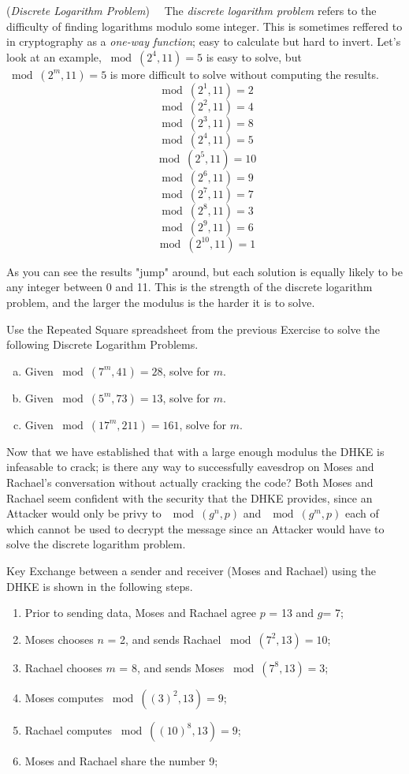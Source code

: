\begin{defn} \label{def:DLP}(\emph{Discrete Logarithm Problem})~~
The \emph{discrete logarithm problem} refers to the difficulty of finding logarithms modulo some integer. This is sometimes reffered to in cryptography as a \emph{one-way function}; easy to calculate but hard to invert. Let's look at an example, $\bmod(2^{4},  11) = 5$ is easy to solve, but $\bmod(2^{m},  11) = 5$ is more difficult to solve without computing the results. 
$$ \bmod(2^{1}, 11)=2$$
$$ \bmod(2^{2}, 11)=4$$
$$ \bmod(2^{3}, 11)=8$$
$$ \bmod(2^{4}, 11)=5$$
$$ \bmod(2^{5}, 11)=10$$
$$ \bmod(2^{6}, 11)=9$$
$$ \bmod(2^{7}, 11)=7$$
$$ \bmod(2^{8}, 11)=3$$
$$ \bmod(2^{9}, 11)=6$$
$$ \bmod(2^{10}, 11)=1$$

As you can see the results "jump" around, but each solution is equally likely to be any integer between 0 and 11.  This is the strength of the discrete logarithm problem, and the larger the modulus is the harder it is to solve.
\end{defn}
\begin{exer}
Use the Repeated Square spreadsheet from the previous Exercise to solve the following Discrete Logarithm Problems.  
\begin{enumerate}[(a)]
\item Given $ \bmod(7^{m}, 41)=28$, solve for $m$.

\item Given $ \bmod(5^{m}, 73)=13$, solve for $m$.

\item Given $ \bmod(17^{m}, 211)=161$, solve for $m$.
\end{enumerate}
\end{exer}
Now that we have established that with a large enough modulus the DHKE is infeasable to crack; is there any way to successfully eavesdrop on Moses and Rachael's conversation without actually cracking the code?  Both Moses and Rachael seem confident with the security that the DHKE provides, since an Attacker would only be privy to $\mod (g^n , p)$ and $\mod (g^m , p)$ each of which cannot be used to decrypt the message since an Attacker would have to solve the discrete logarithm problem.

\begin{eg} Key Exchange between a sender and receiver (Moses and Rachael) using the DHKE is shown in the following steps.
\begin{enumerate}[Step 1.]
\item Prior to sending data, Moses and Rachael agree $p$ = 13 and $g$= 7; 
\item Moses chooses $n$ = 2, and sends Rachael $\bmod (7^2 , 13) = 10$;
\item Rachael chooses $m$ = 8, and sends Moses $\bmod (7^8  , 13) = 3 $;
\item Moses computes $\bmod ((3)^2 , 13 ) = 9$;
\item Rachael computes $\bmod ((10)^8 , 13 ) = 9$;
\item Moses and Rachael share the number 9;
\end{enumerate}
\end{eg}

